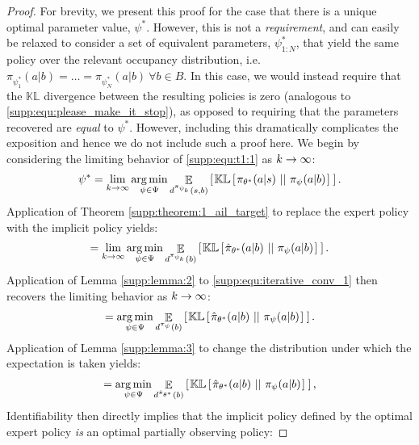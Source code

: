 \begin{proof}
For brevity, we present this proof for the case that there is a unique optimal parameter value, $\psi^*$.  However, this is not a \emph{requirement}, and can easily be relaxed to consider a set of equivalent parameters, $\psi^*_{1:N}$, that yield the same policy over the relevant occupancy distribution, i.e. $\pi_{\psi^*_1}(a | b) = \ldots = \pi_{\psi^*_N}(a | b) \ \forall b \in \hat{B}$.  In this case, we would instead require that the $\mathbb{KL}$ divergence between the resulting policies is zero (analogous to \eqref{supp:equ:please_make_it_stop}), as opposed to requiring that the parameters recovered are \emph{equal} to $\psi^*$.  However, including this dramatically complicates the exposition and hence we do not include such a proof here. We begin by considering the limiting behavior of \eqref{supp:equ:t1:1} as $k \rightarrow \infty$:
\begin{align}
    \psi^* = \lim_{k \rightarrow \infty} \mathop{\operatorname{arg\,min}}_{\psi \in \Psi}  \mathop{\mathbb{E}}_{d^{\pi_{\psi_k}}(s,b)}  \left[ \hspace*{0.1em}{}  \mathbb{KL} \left[ \hspace*{0.1em}{}  \pi_{\theta^*}(a|s) \ ||\ {} \pi_\psi(a|b) \hspace*{0.1em} \right]{}  \hspace*{0.1em} \right]{} .
\end{align}
Application of Theorem \ref{supp:theorem:1_ail_target} to replace the expert policy with the implicit policy yields:
\begin{align}
    = \lim_{k \rightarrow \infty} \mathop{\operatorname{arg\,min}}_{\psi \in \Psi}  \mathop{\mathbb{E}}_{d^{\pi_{\psi_k}}(b)}  \left[ \hspace*{0.1em}{}  \mathbb{KL} \left[ \hspace*{0.1em}{}  \hat{\pi}_{\theta^*}(a|b) \ ||\ {} \pi_\psi(a|b) \hspace*{0.1em} \right]{}  \hspace*{0.1em} \right]{} .  \label{supp:equ:iterative_conv_1}
\end{align}
Application of Lemma \ref{supp:lemma:2} to \eqref{supp:equ:iterative_conv_1} then recovers the limiting behavior as $k\rightarrow \infty$:
\begin{align}
    = \mathop{\operatorname{arg\,min}}_{\psi \in \Psi}  \mathop{\mathbb{E}}_{d^{\pi_{\psi}}(b)}  \left[ \hspace*{0.1em}{}  \mathbb{KL} \left[ \hspace*{0.1em}{}  \hat{\pi}_{\theta^*}(a|b) \ ||\ {} \pi_\psi(a|b) \hspace*{0.1em} \right]{}  \hspace*{0.1em} \right]{} .
\end{align}
Application of Lemma \ref{supp:lemma:3} to change the distribution under which the expectation is taken yields: 
\begin{align}
    = \mathop{\operatorname{arg\,min}}_{\psi \in \Psi}  \mathop{\mathbb{E}}_{d^{\hat{\pi}_{\theta^*}}(b)}  \left[ \hspace*{0.1em}{}  \mathbb{KL} \left[ \hspace*{0.1em}{}  \hat{\pi}_{\theta^*}(a|b)\ ||\ {} \pi_\psi(a|b) \hspace*{0.1em} \right]{}  \hspace*{0.1em} \right]{} , \label{supp:equ:murh}
\end{align}
Identifiability then directly implies that the implicit policy defined by the optimal expert policy \emph{is} an optimal partially observing policy:

\end{proof}
